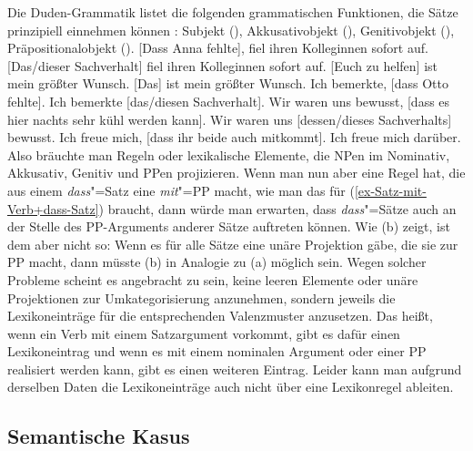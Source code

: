Die Duden-Grammatik listet die folgenden grammatischen Funktionen, die Sätze prinzipiell einnehmen können
\citep[§1650]{Duden2005-Authors}: Subjekt (), Akkusativobjekt (), Genitivobjekt
(), Präpositionalobjekt ().
\eal
\ex {}[Dass Anna fehlte], fiel ihren Kolleginnen sofort auf.
\ex {}[Das/dieser Sachverhalt] fiel ihren Kolleginnen sofort auf.
\ex {}[Euch zu helfen] ist mein größter Wunsch.
\ex {}[Das] ist mein größter Wunsch.
\zl
\eal
\ex Ich bemerkte, [dass Otto fehlte].
\ex Ich bemerkte [das/diesen Sachverhalt].
\zl
\eal
\ex Wir waren uns bewusst, [dass es hier nachts sehr kühl werden kann].
\ex Wir waren uns [dessen/dieses Sachverhalts] bewusst.
\zl
\eal
\ex Ich freue mich, [dass ihr beide auch mitkommt].
\ex Ich freue mich darüber.
\zl
\largerpage
Also bräuchte man Regeln oder lexikalische Elemente, die NPen im Nominativ, Akkusativ, Genitiv und
PPen projizieren. Wenn man nun aber eine Regel hat, die aus einem \emph{dass}"=Satz eine
\emph{mit}"=PP macht, wie man das für (\ref{ex-Satz-mit-Verb+dass-Satz}) braucht, dann würde man
erwarten, dass \emph{dass}"=Sätze auch an der Stelle des PP-Arguments anderer Sätze auftreten
können. Wie (b) zeigt, ist dem aber nicht so:
\eal
{}
\zl 
Wenn es für alle Sätze eine unäre Projektion gäbe, die sie zur PP macht, dann müsste (b) in
Analogie zu (a) möglich sein. Wegen solcher Probleme scheint es angebracht zu sein, keine
leeren Elemente oder unäre Projektionen zur Umkategorisierung anzunehmen, sondern jeweils die
Lexikoneinträge für die entsprechenden Valenzmuster anzusetzen. Das heißt, wenn ein Verb mit einem
Satzargument vorkommt, gibt es dafür einen Lexikoneintrag und wenn es mit einem nominalen Argument
oder einer PP realisiert werden kann, gibt es einen weiteren Eintrag. Leider kann man aufgrund
derselben Daten die Lexikoneinträge auch nicht über eine Lexikonregel ableiten.


\subsection{Semantische Kasus}
\label{sec-sem-kasus}

